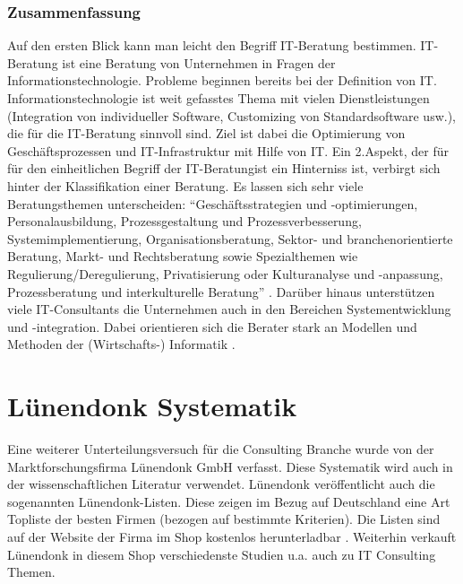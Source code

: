 		\subsubsection{Zusammenfassung} 
			
			
			Auf den ersten Blick kann man leicht den Begriff IT-Beratung bestimmen. IT-Beratung ist eine Beratung von Unternehmen in Fragen der Informationstechnologie. Probleme beginnen bereits bei der Definition von IT. Informationstechnologie ist weit gefasstes Thema mit vielen Dienstleistungen (Integration von individueller Software, Customizing von Standardsoftware usw.), die für die IT-Beratung sinnvoll sind. Ziel ist dabei die Optimierung von Geschäftsprozessen und IT-Infrastruktur mit Hilfe von IT.
			Ein 2.Aspekt, der für für den einheitlichen Begriff der IT-Beratungist ein Hinterniss ist, verbirgt sich hinter der Klassifikation einer Beratung. Es lassen sich sehr viele Beratungsthemen unterscheiden: %
			 ``Geschäftsstrategien und -optimierungen, Personalausbildung, Prozessgestaltung und Prozessverbesserung, Systemimplementierung, Organisationsberatung, Sektor- und branchenorientierte Beratung, Markt- und Rechtsberatung sowie Spezialthemen wie
			Regulierung/Deregulierung,  Privatisierung oder Kulturanalyse und -anpassung, Prozessberatung und  interkulturelle Beratung'' \cite[37]{ReinekeBock200709}.
			Darüber hinaus unterstützen viele IT-Consultants die Unternehmen auch in den Bereichen Systementwicklung und -integration. Dabei orientieren sich die Berater stark an Modellen und Methoden der (Wirtschafts-) Informatik \cite{InfTag2011}.
			

\section{Lünendonk Systematik}
Eine weiterer Unterteilungsversuch für die Consulting Branche wurde von der Marktforschungsfirma Lünendonk GmbH verfasst.
Diese Systematik wird auch in der wissenschaftlichen Literatur \cite[56]{Lippold201309} verwendet. Lünendonk veröffentlicht
auch die sogenannten Lünendonk-Listen. Diese zeigen im Bezug auf Deutschland eine Art Topliste der besten Firmen (bezogen auf bestimmte Kriterien).
Die Listen sind auf der Website der Firma im Shop kostenlos herunterladbar \cite {topBITP} . Weiterhin verkauft Lünendonk in diesem Shop verschiedenste Studien u.a.
auch zu IT Consulting Themen.


